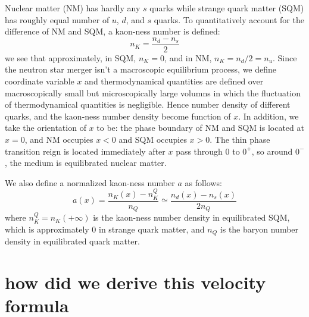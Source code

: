 \documentclass[superscriptaddress,amsmath,floatfix,aps,prc,twocolumn]{revtex4-1}
\newcommand{\AH}[1]{\textsf{\color{cyan}{\textsuperscript{AH}#1}}}
\begin{document}
Nuclear matter (NM) has hardly any $s$ quarks while strange quark matter (SQM) has roughly equal number of $u$, $d$, and $s$ quarks. To quantitatively account for the difference of NM and SQM, a kaon-ness number is defined:
\begin{equation}
n_K = \frac{n_d - n_s}{2}
\end{equation}
we see that approximately, in SQM, $n_K = 0$, and in NM, $n_K = n_d/2 = n_u$. 
Since the neutron star merger isn't a macroscopic equilibrium process, we define coordinate variable $x$ and thermodynamical quantities are defined over macroscopically small but microscopically large volumns in which the fluctuation of thermodynamical quantities is negligible. Hence number density of different quarks, and the kaon-ness number density become function of $x$. In addition, we take the orientation of $x$ to be: the phase boundary of NM and SQM is located at $x=0$, and NM occupies $x<0$ and SQM occupies $x>0$. The thin phase transition reign is located immediately after $x$ pass through 0 to $0^+$, so around $0^-$, the medium is equilibrated nuclear matter.  

We also define a normalized kaon-ness number $a$ as follows:
\begin{equation}
a(x) = \frac{n_K(x) - n_K^Q}{n_Q} \simeq \frac{n_d(x) - n_s(x)}{2n_Q} \label{def_of_a}
\end{equation}
where $n_K^Q = n_K(+\infty)$ is the kaon-ness number density in equilibrated SQM, which is approximately 0 in strange quark matter, and $n_Q$ is the baryon number density in equilibrated quark matter. 


\section{how did we derive this velocity formula}
\end{document}

